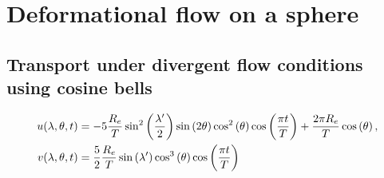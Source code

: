 \section{Deformational flow on a sphere}

\subsection{Transport under divergent flow conditions using cosine bells}
\label{sec:deformationSphere:divergent}

\begin{align}
	u(\lambda, \theta, t) &= -5 \frac{R_e}{T} \sin^2 \left( \frac{\lambda'}{2} \right) \sin \left(2 \theta \right) \cos^2 \left( \theta \right) \cos \left( \frac{\pi t}{T} \right) + \frac{2 \pi R_e}{T} \cos \left( \theta \right) \text{,} \\
	v(\lambda, \theta, t) &= \frac{5}{2} \frac{R_e}{T} \sin \left( \lambda' \right) \cos^3 \left( \theta \right) \cos \left( \frac{\pi t}{T} \right)
\end{align}

